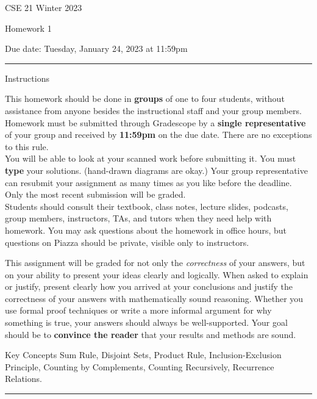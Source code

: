 \documentclass[10pt,letterpaper,unboxed,cm]{article}
\begin{document}
\hfill{CSE 21 Winter 2023}

\hfill{Homework 1}

\hfill{Due date: Tuesday, January 24, 2023 at 11:59pm}

\begin{center}
\begin{minipage}[t]{5.7in}
\rule{\linewidth}{2pt}
{\sc Instructions}\newline

This homework should be done in {\bf groups} of one to four students, without assistance from anyone besides the instructional staff and your group members.  Homework must be submitted through Gradescope by a {\bf single representative} of your group and received by {\bf 11:59pm} on the due date. There are no exceptions to this rule.\\
 
You will be able to look at your scanned work before submitting it. 
 You must {\bf type} your solutions. (hand-drawn diagrams are okay.)
 Your group representative can resubmit your assignment as many times as you like before the deadline. Only the most recent submission will be graded.\\

Students should consult their textbook, class notes, lecture slides, podcasts, group members, instructors, TAs, and tutors when 
they need help with homework. You may ask questions about the homework in office hours, but questions on Piazza should be private, visible only to instructors. 

This assignment will be graded for not only the \emph{correctness} of your answers, but on your ability to present your ideas clearly and logically. When asked to explain or justify, present clearly how you arrived at your conclusions and justify the correctness of your answers with mathematically sound reasoning. Whether you use formal proof techniques or write a more informal argument for why something is true, your answers should always be well-supported. Your goal should be to {\bf convince the reader} that your results and methods are sound.





{\sc Key Concepts} Sum Rule, Disjoint Sets, Product Rule, Inclusion-Exclusion Principle, Counting by Complements, Counting Recursively, Recurrence Relations.


\rule{\linewidth}{2pt}
\end{minipage} \hfill

\end{center}
\end{document}
